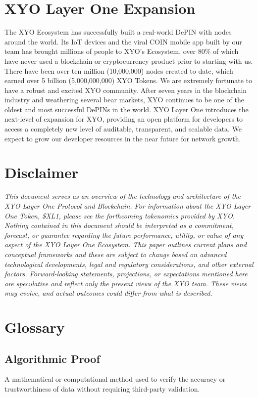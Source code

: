 \documentclass{article}
\begin{document}
\section{XYO Layer One Expansion}
The XYO Ecosystem has successfully built a real-world DePIN with nodes around the world. Its IoT devices and the viral COIN mobile app built by our team has brought millions of people to XYO's Ecosystem, over 80\% of which have never used a blockchain or cryptocurrency product prior to starting with us. There have been over ten million (10,000,000) nodes created to date, which earned over 5 billion (5,000,000,000) XYO Tokens. We are extremely fortunate to have a robust and excited XYO community. After seven years in the blockchain industry and weathering several bear markets, XYO continues to be one of the oldest and most successful DePINs in the world. XYO Layer One introduces the next-level of expansion for XYO, providing an open platform for developers to access a completely new level of auditable, transparent, and scalable data. We expect to grow our developer resources in the near future for network growth.

\newpage
\section*{Disclaimer}
\textit{This document serves as an overview of the technology and architecture of the XYO Layer One Protocol and Blockchain. For information about the XYO Layer One Token, \$XL1, please see the forthcoming tokenomics provided by XYO.
Nothing contained in this document should be interpreted as a commitment, forecast, or guarantee regarding the future performance, utility, or value of any aspect of the XYO Layer One Ecosystem. This paper outlines current plans and conceptual frameworks and these are subject to change based on advanced technological developments, legal and regulatory considerations, and other external factors. Forward-looking statements, projections, or expectations mentioned here are speculative and reflect only the present views of the XYO team. These views may evolve, and actual outcomes could differ from what is described.}



\newpage

\section*{Glossary}

\subsection*{Algorithmic Proof}
A mathematical or computational method used to verify the accuracy or trustworthiness of data without requiring third-party validation.
\end{document}
